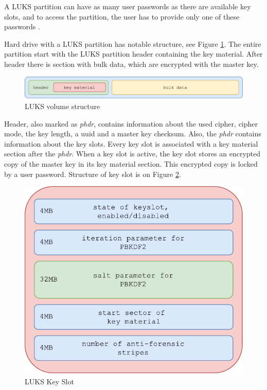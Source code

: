 A LUKS partition can have as many user passwords as there are available key slots, and to access the partition, the user has to provide only one of these passwords \cite{LUKS}.

Hard drive with a LUKS partition has notable structure, see Figure \ref{fig:luksvol}.
The entire partition start with the LUKS partition header containing the key material. 
After header there is section with bulk data, which are encrypted with the master key.

\begin{figure}[h]
    \centering
    \includegraphics[scale=0.7]{figures/LUKSdrive.pdf}
    \caption{LUKS volume structure}
    \label{fig:luksvol}
\end{figure}

Header, also marked as {\it phdr}, contains information about the used cipher, cipher mode, the key length, a uuid and a master key checksum.
Also, the {\it phdr} contains information about the key slots. 
Every key slot is associated with a key material section after the {\it phdr}.  
When a key slot is active, the key slot stores an encrypted copy of the master key in its key material section.
This encrypted copy is locked by a user password.
Structure of key slot is on Figure \ref{fig:luksslot}.

\begin{figure}[h]
    \centering
    \includegraphics[scale=0.6]{figures/LUKSkeyslot.pdf}
    \caption{LUKS Key Slot}
    \label{fig:luksslot}
\end{figure}


